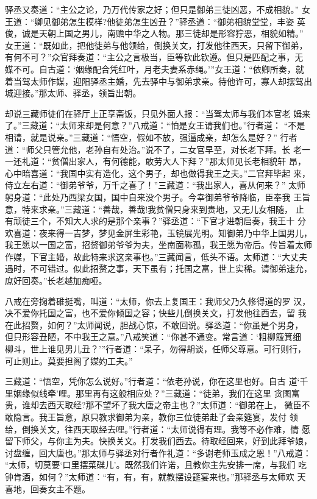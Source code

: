 驿丞又奏道：“主公之论，乃万代传家之好；但只是御弟三徒凶恶，不成相貌。”
女王道：“卿见御弟怎生模样?他徒弟怎生凶丑？”驿丞道：“御弟相貌堂堂，丰姿
英俊，诚是天朝上国之男儿，南赡中华之人物。那三徒却是形容狞恶，相貌如精。”
女王道：“既如此，把他徒弟与他领给，倒换关文，打发他往西天，只留下御弟，
有何不可？”众官拜奏道：“主公之言极当，臣等钦此钦遵。但只是匹配之事，无
媒不可。自古道：‘姻缘配合凭红叶，月老夫妻系赤绳。’”女王道：“依卿所奏，就
着当驾太师作媒，迎阳驿丞主婚，先去驿中与御弟求亲。待他许可，寡人却摆驾出
城迎接。”那太师、驿丞，领旨出朝。

却说三藏师徒们在驿厅上正享斋饭，只见外面人报：“当驾太师与我们本官老
姆来了。”三藏道：“太师来却是何意？”八戒道：“怕是女王请我们也。”行者道：
“不是相请，就是说亲。”三藏道：“悟空，假如不放，强逼成亲，却怎么是好？”
行者道：“师父只管允他，老孙自有处治。”说不了，二女官早至，对长老下拜。长
老一一还礼道：“贫僧出家人，有何德能，敢劳大人下拜？”那太师见长老相貌轩
昂，心中暗喜道：“我国中实有造化，这个男子，却也做得我王之夫。”二官拜毕起
来，侍立左右道：“御弟爷爷，万千之喜了！”三藏道：“我出家人，喜从何来？”
太师躬身道：“此处乃西梁女国，国中自来没个男子。今幸御弟爷爷降临，臣奉我
王旨意，特来求亲。”三藏道：“善哉，善哉!我贫僧只身来到贵地，又无儿女相随，
止有顽徒三个，不知大人求的是那个亲事？”驿丞道：“下官才进朝启奏，我王十
分欢喜道：夜来得一吉梦，梦见金屏生彩艳，玉镜展光明。知御弟乃中华上国男儿，
我王愿以一国之富，招赘御弟爷爷为夫，坐南面称孤，我王愿为帝后。传旨着太师
作媒，下官主婚，故此特来求这亲事也。”三藏闻言，低头不语。太师道：“大丈夫
遇时，不可错过。似此招赘之事，天下虽有；托国之富，世上实稀。请御弟速允，
庶好回奏。”长老越加痴哑。

八戒在旁掬着碓挺嘴，叫道：“太师，你去上复国王：我师父乃久修得道的罗
汉，决不爱你托国之富，也不爱你倾国之容；快些儿倒换关文，打发他往西去，留
我在此招赘，如何？”太师闻说，胆战心惊，不敢回说。驿丞道：“你虽是个男身，
但只形容丑陋，不中我王之意。”八戒笑道：“你甚不通变。常言道：‘粗柳簸箕细
柳斗，世上谁见男儿丑？’”行者道：“呆子，勿得胡谈，任师父尊意。可行则行，
可止则止。莫要担阁了媒妁工夫。”

三藏道：“悟空，凭你怎么说好。”行者道：“依老孙说，你在这里也好。自古
道‘千里姻缘似线牵’哩。那里再有这般相应处？”三藏道：“徒弟，我们在这里
贪图富贵，谁却去西天取经?那不望坏了我大唐之帝主也？”太师道：“御弟在上，
微臣不敢隐言。我王旨意，原只教求御弟为亲，教你三位徒弟赴了会亲筵宴，发付
领给，倒换关文，往西天取经去哩。”行者道：“太师说得有理。我等不必作难，情
愿留下师父，与你主为夫。快换关文。打发我们西去。待取经回来，好到此拜爷娘，
讨盘缠，回大唐也。”那太师与驿丞对行者作礼道：“多谢老师玉成之恩！”八戒道：
“太师，切莫要‘口里摆菜碟儿’。既然我们许诺，且教你主先安排一席，与我们
吃钟肯酒，如何？”太师道：“有，有，有，就教摆设筵宴来也。”那驿丞与太师欢
天喜地，回奏女主不题。

